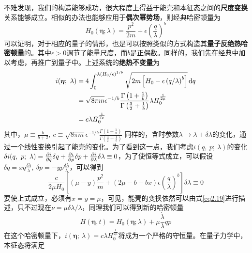 不难发现，我们的构造能够成功，很大程度上得益于能壳和本征态之间的\textbf{尺度变换}关系能够成立。相似的办法也能够应用于\textbf{偶次幂势场}，则经典哈密顿量为
\begin{equation}
    H_{0}(\bm{\eta} ; \lambda)=\frac{p^{2}}{2 m}+\epsilon\left(\frac{q}{\lambda}\right)^{b}
    \label{eq2.26}
\end{equation}
可以证明，对于相应的量子的情形，也是可以按照类似的方式构造其\textbf{量子反绝热哈密顿量}的。其中$\epsilon > 0$调节了能量尺度，而$b$是正偶数。同样的，我们先在经典中加以考虑，再推广到量子中。上述系统的\textbf{绝热不变量}为
\begin{equation}
    \begin{split}
        i(\bm{\eta};\ \lambda) &= 4 \int_0^{\lambda \left(H_0 / \epsilon \right)^{1/b}} \sqrt{2 m \left[ H_0 -\epsilon \left(q/{\lambda}\right)^b\right]} \, \mathrm{d}q \\ 
        &= \sqrt{8 \pi m} \epsilon^{-1 / b} \frac{\Gamma\left(1+\frac{1}{b}\right)}{\Gamma\left(\frac{3}{2}+\frac{1}{b}\right)} \lambda H_0^{\frac{1}{2 \mu}}\\
        &= c \lambda H_0^{\frac{1}{2 \mu}}
    \end{split}
    \label{eq2.27}
\end{equation}
其中，$\mu \equiv \frac{b}{b+2} ,\ c \equiv \sqrt{8 \pi m} \epsilon^{-1 / b} \frac{\Gamma\left(1+\frac{1}{b}\right)}{\Gamma\left(\frac{3}{2}+\frac{1}{b}\right)}$
同样的，含时参数$\lambda \to \lambda + \delta \lambda$的变化，通过一个线性变换引起了能壳的变化。为了看到这一点，我们考虑$i(q,\ p;\ \lambda)$的变化$\delta i(q,\ p;\ \lambda) = \frac{\partial i}{\partial q} \delta q + \frac{\partial i}{\partial p} \delta p + \frac{\partial i}{\partial \lambda} \delta \lambda \equiv 0$，为了使恒等式成立，可以假设$\delta q = x q \frac{\delta \lambda}{\lambda},\ \delta p = - y p \frac{\delta \lambda}{\lambda}$，可以得到
\begin{equation}
    \frac{c}{2 \mu H_0} \left[ (\mu - y) \frac{p^2}{m} + (2 \mu - b + b x) \epsilon \left( \frac{q}{\lambda} \right)^b \right] \delta \lambda \equiv 0
    \label{eq2.28}
\end{equation}
要使上式成立，必须有$x=y=\mu$，可见，能壳的变换依然可以由式\eqref{eq2.19}进行描述，只不过现在$\nu = \mu \delta \lambda / \lambda$，同理我们可以得到新的哈密顿量
\begin{equation}
    H(\bm{\eta}, t)=H_{0}(\bm{\eta} ; \lambda)+\mu \frac{\dot{\lambda}}{\lambda} q p
    \label{eq2.28.5}
\end{equation}
在这个哈密顿量下，$i(\bm{\eta};\ \lambda) = c \lambda H_0^{\frac{1}{2 \mu}}$将成为一个严格的守恒量。在量子力学中，本征态将满足
